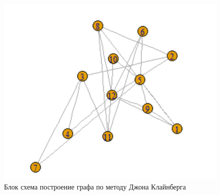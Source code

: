 \begin{figure}[H]
    \centering
    \includegraphics[scale=0.3]{./pictures/random_graph.png}
    \caption{Блок схема построение графа по методу Джона Клайнберга} \label{Kleinberg_graph_block_scheme}
\end{figure}

